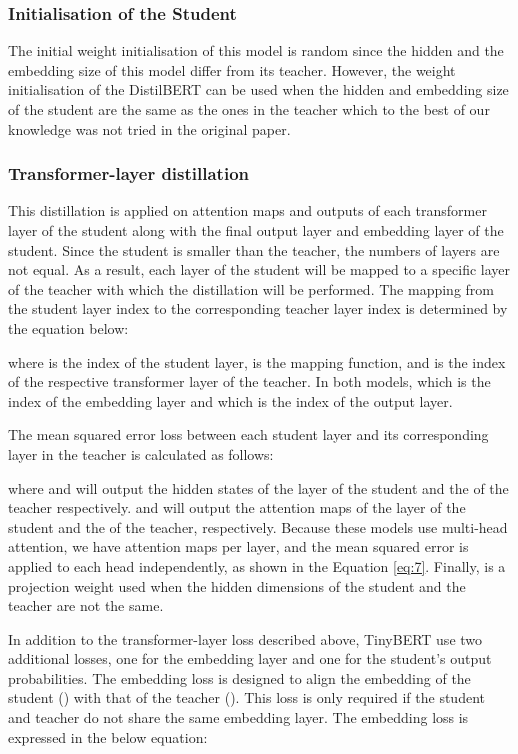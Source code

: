 \documentclass{article}
\begin{document}
\subsubsection{Initialisation of the Student}
The initial weight initialisation of this model is random since the hidden and the embedding size of this model differ from its teacher. However, the weight initialisation of the DistilBERT can be used when the hidden and embedding size of the student are the same as the ones in the teacher which to the best of our knowledge was not tried in the original paper.

\subsubsection{Transformer-layer distillation}
This distillation is applied on attention maps and outputs of each transformer layer of the student along with the final output layer and embedding layer of the student. Since the student is smaller than the teacher, the numbers of layers are not equal. As a result, each layer of the student will be mapped to a specific layer of the teacher with which the distillation will be performed. The mapping from the student layer index to the corresponding teacher layer index is determined by the equation below:


where  is the index of the student layer,  is the mapping function, and  is the index of the respective transformer layer of the teacher. In both models,  which is the index of the embedding layer and  which is the index of the output layer.

The mean squared error loss between each student layer and its corresponding layer in the teacher is calculated as follows: 


where  and  will output the hidden states of the  layer of the student and the  of the teacher respectively.  and  will output the attention maps of the  layer of the student and the  of the teacher, respectively. Because these models use multi-head attention, we have  attention maps per layer, and the mean squared error is applied to each head independently, as shown in the Equation \ref{eq:7}. Finally,  is a projection weight used when the hidden dimensions of the student and the teacher are not the same.

In addition to the transformer-layer loss described above, TinyBERT use two additional losses, one for the embedding layer and one for the student's output probabilities. The embedding loss is designed to align the embedding of the student () with that of the teacher (). This loss is only required if the student and teacher do not share the same embedding layer. The embedding loss is expressed in the below equation:
\end{document}

